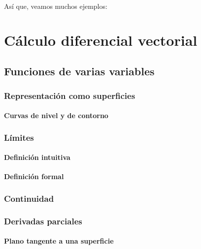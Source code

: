 \documentclass[12pt, fleqn]{report}                             %
\theoremstyle{break}                                            %
\begin{document}
    	Así que, veamos muchos ejemplos:


\part{Cálculo diferencial vectorial}

    \chapter{Funciones de varias variables}
    
        \section{Representación como superficies}
        
            \subsection{Curvas de nivel y de contorno}
            
        \section{Límites}
            
            \subsection{Definición intuitiva}
            
            \subsection{Definición formal}
            
        \section{Continuidad}
        
        \section{Derivadas parciales}
        
            \subsection{Plano tangente a una superficie}
            
\end{document}
